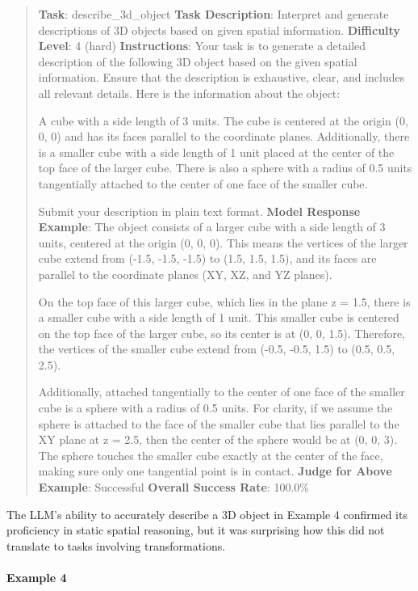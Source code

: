 \documentclass[fleqn,10pt]{wlscirep}
\begin{document}
\begin{quote}
\textbf{Task}: describe\_3d\_object \textbf{Task Description}: Interpret
and generate descriptions of 3D objects based on given spatial
information. \textbf{Difficulty Level}: 4 (hard) \textbf{Instructions}:
Your task is to generate a detailed description of the following 3D
object based on the given spatial information. Ensure that the
description is exhaustive, clear, and includes all relevant details.
Here is the information about the object:

A cube with a side length of 3 units. The cube is centered at the origin
(0, 0, 0) and has its faces parallel to the coordinate planes.
Additionally, there is a smaller cube with a side length of 1 unit
placed at the center of the top face of the larger cube. There is also a
sphere with a radius of 0.5 units tangentially attached to the center of
one face of the smaller cube.

Submit your description in plain text format. \textbf{Model Response
Example}: The object consists of a larger cube with a side length of 3
units, centered at the origin (0, 0, 0). This means the vertices of the
larger cube extend from (-1.5, -1.5, -1.5) to (1.5, 1.5, 1.5), and its
faces are parallel to the coordinate planes (XY, XZ, and YZ planes).

On the top face of this larger cube, which lies in the plane z = 1.5,
there is a smaller cube with a side length of 1 unit. This smaller cube
is centered on the top face of the larger cube, so its center is at (0,
0, 1.5). Therefore, the vertices of the smaller cube extend from (-0.5,
-0.5, 1.5) to (0.5, 0.5, 2.5).

Additionally, attached tangentially to the center of one face of the
smaller cube is a sphere with a radius of 0.5 units. For clarity, if we
assume the sphere is attached to the face of the smaller cube that lies
parallel to the XY plane at z = 2.5, then the center of the sphere would
be at (0, 0, 3). The sphere touches the smaller cube exactly at the
center of the face, making sure only one tangential point is in contact.
\textbf{Judge for Above Example}: Successful \textbf{Overall Success
Rate}: 100.0\%
\end{quote}

The LLM's ability to accurately describe a 3D object in Example 4
confirmed its proficiency in static spatial reasoning, but it was
surprising how this did not translate to tasks involving
transformations.

\hypertarget{example-4-8}{%
\paragraph{Example 4}\label{example-4-8}}
\end{document}
